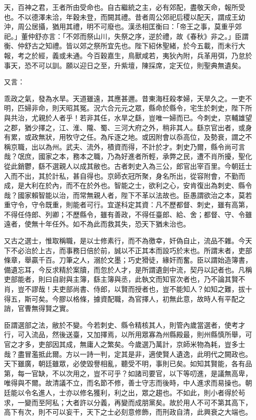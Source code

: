 \begin{pinyinscope}
 天，百神之君，王者所由受命也。自古繼統之主，必有郊配，盡敬天命，報所受也。不以德澤未洽，年穀未登，而闕其禮。昔者周公郊祀后稷以配天，謂成王幼沖，周公居攝，猶用其禮，明不可廢也。漢丞相匡衡曰：「帝王之事，莫重乎郊祀。」董仲舒亦言：「不郊而祭山川，失祭之序，逆於禮，故《春秋》非之。」臣謂衡、仲舒古之知禮。皆以郊之祭所宜先也。陛下紹休聖緒，於今五載，而未行大報，考之於經，義或未通。今百穀嘉生，鳥獸咸若，夷狄內附，兵革用弭，乃怠於事天，恐不可以訓。願以迎日之至，升紫壇，陳採席，定天位，則聖典無遺矣。



 又言：



 乖政之氣，發為水旱。天道雖遠，其應甚邇。昔東海枉殺孝婦，天旱久之。一吏不明，匹婦非命，則天昭其冤。況六合元元之眾，縣命於縣令，宅生於刺史，陛下所與共治，尤親於人者乎！若非其任，水旱之繇，豈唯一婦而已。今刺史，京輔雄望之郡，猶少擇之，江、淮、隴、蜀、三河大府之外，稍非其人。繇京官出者，或身有累，或政無狀，用牧守之任。為斥逐之地。或因附會以忝高位，及勢衰，謂之不稱京職，出以為州。武夫、流外，積資而得，不計於才。刺史乃爾，縣令尚可言哉？氓庶，國家之本，務本之職，乃為好進者所輕，承弊之民，遭不肖所擾，聖化從此銷鬱，繇不選親人以成其敝也。古者刺史入為三公，郎官出宰百里。今朝廷士入而不出，其於計私，甚自得也。京師衣冠所聚，身名所出，從容附會，不勤而成，是大利在於內，而不在於外也。智能之士，欲利之心，安肯復出為刺史、縣令哉？國家賴智能以治，而常無親人者，陛下不革以法故也。臣愚謂欲治之本，莫若重守令，守令既重，則能者可行。宜遂科定其資：凡不歷都督、刺史，雖有高第，不得任侍郎、列卿；不歷縣令，雖有善政，不得任臺郎、給、舍；都督、守、令雖遠者，使無十年任外。如不為此而救其失，恐天下猶未治也。



 又古之選士，惟取稱職，是以士修素行，而不為徼幸，奸偽自止，流品不雜。今天下不必治於上古，而事務日倍於前，誠以不正其本而設巧於末也。所謂末者，吏部條章，舉贏千百。刀筆之人，溺於文墨；巧史猾徒，緣奸而奮。臣以謂始造簿書，備遺忘耳，今反求精於案牘，而忽於人才，是所謂遺劍中流，契丹以記者也。凡稱吏部能者，則曰自尉與主簿，繇主簿與丞，此執文而知官次者也，乃不論其賢不肖，豈不謬哉！夫吏部尚書、侍郎，以賢而授者也，豈不能知人？如知之難，拔十得五，斯可矣。今膠以格條，據資配職，為官擇人，初無此意，故時人有平配之誚，官曹無得賢之實。



 臣謂選部之法，敝於不變。今若刺史、縣令精核其人，則管內歲當選者，使考才行，可入流品，然後送臺，又加擇焉，以所用眾寡為州縣殿最，則州縣慎所舉，可官之才多，吏部因其成，無庸人之繁矣。今歲選乃萬計，京師米物為耗，豈多士哉？盡冒濫抵此爾。方以一詩一判，定其是非，適使賢人遺逸，此明代之闕政也。天下雖廣，朝廷雖眾，必使毀譽相亂，聽受不明，事則已矣。如知其賢能，各有品第，每一官缺，不以次用之，豈不可乎？如諸司要官，以下等叨進，是議無高卑，唯得與不爾。故清議不立，而名節不修，善士守志而後時，中人進求而易操也。朝廷能以令名進人，士亦以修名獲利，利之出，眾之趨也。不如此，則小者得於茍求，一變而至阿私；大者許以分義，再變而成朋黨矣。故於用人不可不第其高下，高下有次，則不可以妄干，天下之士必刻意修飾，而刑政自清，此興衰之大端也。




\end{pinyinscope}
